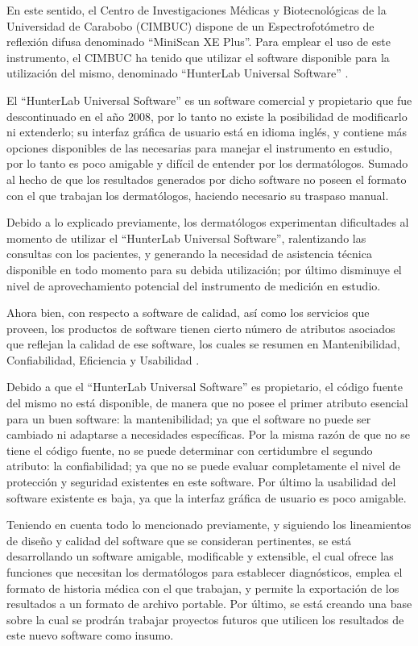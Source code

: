 \documentclass[conference]{IEEEtran}
\begin{document}
En este sentido, el Centro de Investigaciones M\'{e}dicas y Biotecnol\'{o}gicas de la Universidad de Carabobo (CIMBUC) dispone de un Espectrofot\'{o}metro de reflexi\'{o}n difusa denominado ``MiniScan XE Plus''. Para emplear el uso de este instrumento, el CIMBUC ha tenido que utilizar el software disponible para la utilizaci\'{o}n del mismo, denominado ``HunterLab Universal Software'' \cite{HunterLab-manual}.

El ``HunterLab Universal Software'' es un software comercial y propietario que fue descontinuado en el a\~{n}o 2008, por lo tanto no existe la posibilidad de modificarlo ni extenderlo; su interfaz gr\'{a}fica de usuario est\'{a} en idioma ingl\'{e}s, y contiene m\'{a}s opciones disponibles de las necesarias para manejar el instrumento en estudio, por lo tanto es poco amigable y dif\'{i}cil de entender por los dermat\'{o}logos. Sumado al hecho de que los resultados generados por dicho software no poseen el formato con el que trabajan los dermat\'{o}logos, haciendo necesario su traspaso manual. 

Debido a lo explicado previamente, los dermat\'{o}logos experimentan dificultades al momento de utilizar el ``HunterLab Universal Software'', ralentizando las consultas con los pacientes, y generando la necesidad de asistencia t\'{e}cnica disponible en todo momento para su debida utilizaci\'{o}n; por \'{u}ltimo disminuye el nivel de aprovechamiento potencial del instrumento de medici\'{o}n en estudio.

Ahora bien, con respecto a software de calidad, as\'{i} como los servicios que proveen, los productos de software tienen cierto n\'{u}mero de atributos asociados que reflejan la calidad de ese software, los cuales se resumen en Mantenibilidad, Confiabilidad, Eficiencia y Usabilidad \cite{Sommerville}.

Debido a que el ``HunterLab Universal Software'' es propietario, el c\'{o}digo fuente del mismo no est\'{a} disponible, de manera que no posee el primer atributo esencial para un buen software: la mantenibilidad; ya que el software no puede ser cambiado ni adaptarse a necesidades espec\'{i}ficas. Por la misma raz\'{o}n de que no se tiene el c\'{o}digo fuente, no se puede determinar con certidumbre el segundo atributo: la confiabilidad; ya que no se puede evaluar completamente el nivel de protecci\'{o}n y seguridad existentes en este software. Por \'{u}ltimo la usabilidad del software existente es baja, ya que la interfaz gr\'{a}fica de usuario es poco amigable.

Teniendo en cuenta todo lo mencionado previamente, y siguiendo los lineamientos de dise\~{n}o y calidad del software que se consideran pertinentes, se est\'{a} desarrollando un software amigable, modificable y extensible, el cual ofrece las funciones que necesitan los dermat\'{o}logos para establecer diagn\'{o}sticos, emplea el formato de historia m\'{e}dica con el que trabajan, y permite la exportaci\'{o}n de los resultados a un formato de archivo portable. Por \'{u}ltimo, se est\'{a} creando una base sobre la cual se prodr\'{a}n trabajar proyectos futuros que utilicen los resultados de este nuevo software como insumo.
\end{document}
